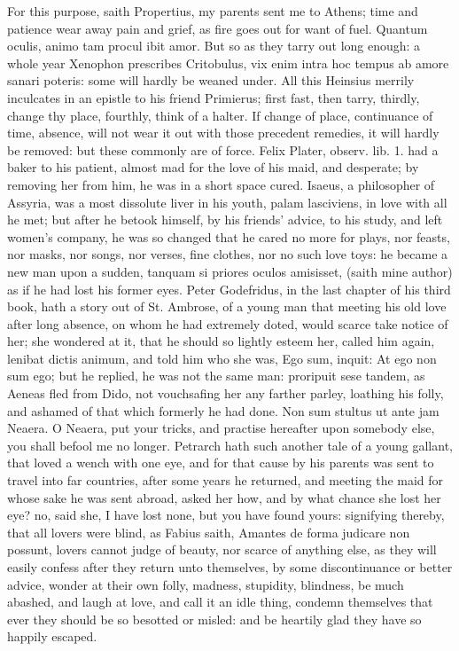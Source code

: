 For this purpose, saith Propertius, my parents sent me to Athens;
time and patience wear away pain and grief, as fire goes out for want
of fuel. Quantum oculis, animo tam procul ibit amor. But so as they
tarry out long enough: a whole year Xenophon prescribes
Critobulus, vix enim intra hoc tempus ab amore sanari poteris: some
will hardly be weaned under. All this Heinsius merrily inculcates
in an epistle to his friend Primierus; first fast, then tarry, thirdly,
change thy place, fourthly, think of a halter. If change of place,
continuance of time, absence, will not wear it out with those precedent
remedies, it will hardly be removed: but these commonly are of force.
Felix Plater, observ. lib. 1. had a baker to his patient, almost mad
for the love of his maid, and desperate; by removing her from him, he
was in a short space cured. Isaeus, a philosopher of Assyria, was a
most dissolute liver in his youth, palam lasciviens, in love with all
he met; but after he betook himself, by his friends' advice, to his
study, and left women's company, he was so changed that he cared no
more for plays, nor feasts, nor masks, nor songs, nor verses, fine
clothes, nor no such love toys: he became a new man upon a sudden,
tanquam si priores oculos amisisset, (saith mine author) as if he
had lost his former eyes. Peter Godefridus, in the last chapter of his
third book, hath a story out of St. Ambrose, of a young man that
meeting his old love after long absence, on whom he had extremely
doted, would scarce take notice of her; she wondered at it, that he
should so lightly esteem her, called him again, lenibat dictis animum,
and told him who she was, Ego sum, inquit: At ego non sum ego; but he
replied, he was not the same man: proripuit sese tandem, as
Aeneas fled from Dido, not vouchsafing her any farther parley,
loathing his folly, and ashamed of that which formerly he had done.
Non sum stultus ut ante jam Neaera. O Neaera, put your tricks,
and practise hereafter upon somebody else, you shall befool me no
longer. Petrarch hath such another tale of a young gallant, that loved
a wench with one eye, and for that cause by his parents was sent to
travel into far countries, after some years he returned, and meeting
the maid for whose sake he was sent abroad, asked her how, and by what
chance she lost her eye? no, said she, I have lost none, but you have
found yours: signifying thereby, that all lovers were blind, as Fabius
saith, Amantes de forma judicare non possunt, lovers cannot judge of
beauty, nor scarce of anything else, as they will easily confess after
they return unto themselves, by some discontinuance or better advice,
wonder at their own folly, madness, stupidity, blindness, be much
abashed, and laugh at love, and call it an idle thing, condemn
themselves that ever they should be so besotted or misled: and be
heartily glad they have so happily escaped.

